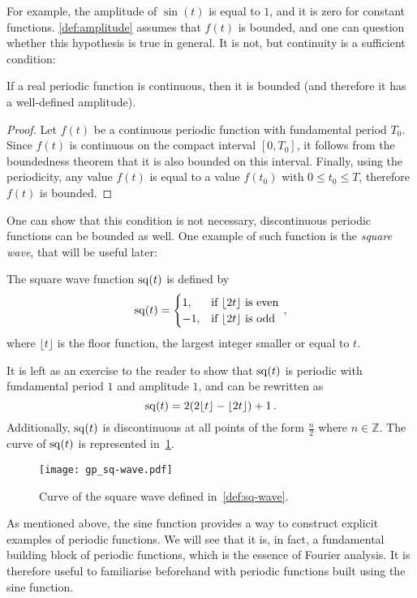 \noindent For example, the amplitude of $\sin(t)$ is equal to $1$, and it is zero for
constant functions. \cref{def:amplitude} assumes that $f(t)$ is bounded, and one can
question whether this hypothesis is true in general. It is not, but continuity is a
sufficient condition:
\begin{proposition}
  If a real periodic function is continuous, then it is bounded (and therefore it has a
  well-defined amplitude).
\end{proposition}
\begin{proof}
  Let $f(t)$ be a continuous periodic function with fundamental period $T_0$. Since $f(t)$
  is continuous on the compact interval $[0,T_0]$, it follows from the boundedness theorem
  that it is also bounded on this interval. Finally, using the periodicity, any value
  $f(t)$ is equal to a value $f(t_0)$ with $0\leq t_0\leq T$, therefore $f(t)$ is bounded.
\end{proof}
\noindent One can show that this condition is not necessary, \ie discontinuous periodic
functions can be bounded as well. One example of such function is the \emph{square wave},
that will be useful later:
\begin{definition}
  \label{def:sq-wave}
  The square wave function $\mathrm{sq}(t)$ is defined by
  \begin{equation}
    \mathrm{sq}(t)=
    \begin{cases}
      1, &\text{if~}\lfloor 2t\rfloor~\text{is even}\\
      -1, &\text{if~}\lfloor 2t\rfloor~\text{is odd}\\
    \end{cases}\,,
  \end{equation}
  where $\lfloor t\rfloor$ is the floor function, \ie the largest integer smaller or equal
  to $t$.
\end{definition}
\noindent It is left as an exercise to the reader to show that $\mathrm{sq}(t)$ is periodic with
fundamental period $1$ and amplitude $1$, and can be rewritten as
\begin{equation}
  \mathrm{sq}(t)=2(2\lfloor t\rfloor-\lfloor 2t\rfloor)+1\,.
\end{equation}
Additionally, $\mathrm{sq}(t)$ is discontinuous at all points of the form $\frac{n}{2}$ where
$n\in\mathbb{Z}$. The curve of $\mathrm{sq}(t)$ is represented in~\cref{fig:sq-wave}.
\begin{figure}[t]
  \centering
  \texttt{[image: gp\_sq-wave.pdf]}
  \caption{Curve of the square wave defined in~\cref{def:sq-wave}.}
  \label{fig:sq-wave}
\end{figure}
As mentioned above, the sine function provides a way to construct explicit examples of
periodic functions. We will see that it is, in fact, a fundamental building block of
periodic functions, which is the essence of Fourier analysis. It is therefore useful to
familiarise beforehand with periodic functions built using the sine function.
